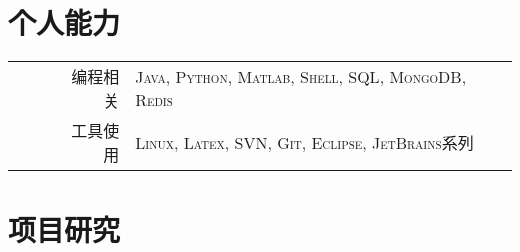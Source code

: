 \documentclass[a4paper,10pt]{professional-cv-cn}
\begin{document}
\section{个人能力}
\begin{tabular}{rl}
 \textsc{~~~~~编程相关}& \textsc{Java}, \textsc{Python}, \textsc{Matlab}, \textsc{Shell}, \textsc{SQL}, \textsc{MongoDB}, \textsc{Redis}\\
 \textsc{~~~~~工具使用}& \textsc{Linux}, \textsc{Latex}, \textsc{SVN}, \textsc{Git}, \textsc{Eclipse}, \textsc{JetBrains系列}\\
\end{tabular}

\section{项目研究}
\end{document}
